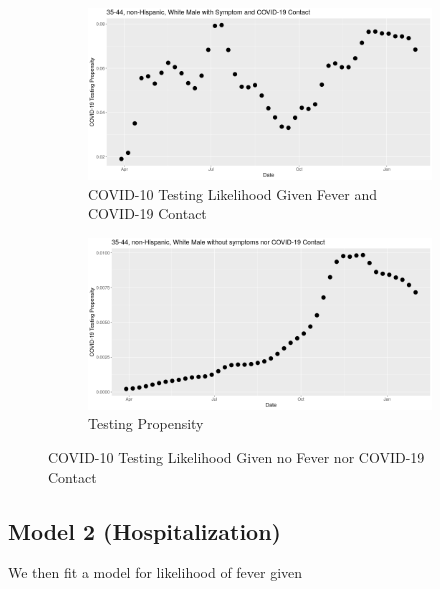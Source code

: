 \documentclass[11pt]{amsart}
\numberwithin{equation}{section}
\theoremstyle{plain}
\begin{document}
\begin{figure}[!th]
\centering
\begin{subfigure}{.5\textwidth}
 \centering
 \includegraphics[width=.9\linewidth]{../figs/tvprop_fig1.png}
 \caption{COVID-10 Testing Likelihood Given Fever and COVID-19 Contact}
 \label{fig:testinglik1}
\end{subfigure}%
\begin{subfigure}{.5\textwidth}
 \centering
\includegraphics[width=.9\linewidth]{../figs/tvprop_fig2.png}
 \caption{Testing Propensity}
 \label{fig:testinglik2}
\end{subfigure}
\caption{COVID-10 Testing Likelihood Given no Fever nor COVID-19 Contact}
\label{fig:testinglik}
\end{figure}

\newpage

\subsection{Model 2 (Hospitalization)}

We then fit a model for likelihood of fever given
\end{document}
